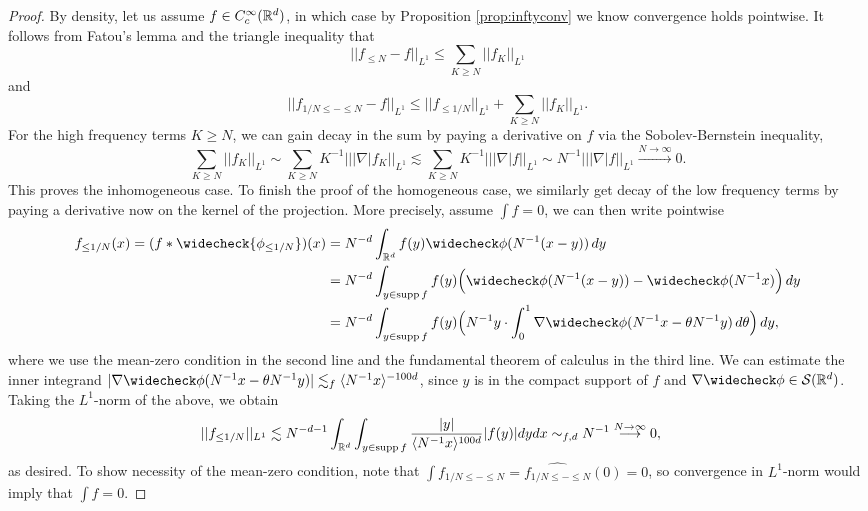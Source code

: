 \begin{proof}
	By density, let us assume $f \in C^\infty_c (\mathbb R^d)$, in which case by Proposition \ref{prop:inftyconv} we know convergence holds pointwise. It follows from Fatou's lemma and the triangle inequality that 
		\[ ||f_{\leq N} - f||_{L^1} \leq \sum_{K \geq N} ||f_K||_{L^1} \]
	and 
		\[ ||f_{1/N \leq - \leq N} - f||_{L^1} \leq ||f_{\leq 1/N}||_{L^1} + \sum_{K \geq N} ||f_K||_{L^1} . \]
	For the high frequency terms $K \geq N$, we can gain decay in the sum by paying a derivative on $f$ via the Sobolev-Bernstein inequality,
		\[ \sum_{K \geq N} ||f_K||_{L^1} \sim \sum_{K \geq N} K^{-1} || |\nabla| f_K||_{L^1} \lesssim \sum_{K \geq N} K^{-1} || |\nabla| f||_{L^1} \sim N^{-1} || |\nabla| f||_{L^1} \overset{N \to \infty}{\longrightarrow} 0.\]
	This proves the inhomogeneous case. To finish the proof of the homogeneous case, we similarly get decay of the low frequency terms by paying a derivative now on the kernel of the projection. More precisely, assume $\int f = 0$,  we can then write pointwise
		\begin{align*}
			 f_{\leq 1/N} (x) = (f * \widecheck{\phi_{\leq 1/N}})(x)
				&= N^{-d} \int_{\R^d} f(y)   \widecheck \phi(N^{-1} (x - y))  \, dy \\
				&= N^{-d} \int_{y \in \supp f} f(y)  \Big( \widecheck \phi(N^{-1} (x - y)) - \widecheck \phi(N^{-1} x) \Big) \, dy\\							&= N^{-d} \int_{y \in \supp f} f(y)  \Big(N^{-1} y \cdot \int_0^1 \nabla \widecheck \phi(N^{-1} x - \theta N^{-1} y )\, d \theta \Big) \, dy,
		\end{align*}
	where we use the mean-zero condition in the second line and the fundamental theorem of calculus in the third line. We can estimate the inner integrand $|\nabla \widecheck \phi (N^{-1} x - \theta N^{-1}y)| \lesssim_f \langle N^{-1} x \rangle^{-100d}$, since $y$ is in the compact support of $f$ and $\nabla \widecheck \phi \in \cS (\R^d)$. Taking the $L^1$-norm of the above, we obtain
			\begin{align*}
				||f_{\leq 1/N} ||_{L^1}								&\lesssim N^{-d - 1} \int_{\mathbb R^d} \int_{y \in \operatorname{supp} f} \frac{|y|}{\langle N^{-1}x \rangle^{100d}}|f(y)| dy dx   \sim_{f, d} N^{-1} \overset{N \to \infty}{\longrightarrow} 0,
					\end{align*}	
	as desired. To show necessity of the mean-zero condition, note that $\int f_{1/N \leq - \leq N} = \widehat{f_{1/N \leq - \leq N}} (0) = 0$, so convergence in $L^1$-norm would imply that $\int f = 0$. 
\end{proof}	


